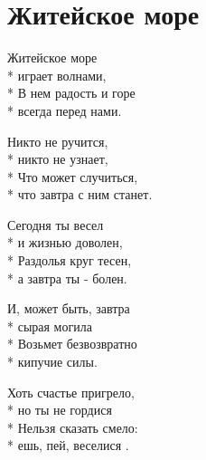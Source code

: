 \vspace{\fill}\newpage

\section{Житейское море}
\label{song:Житейское_море}

\medskip

\begin{minipage}{\linewidth}
Житейское море\\*
играет волнами,\\*
В нем радость и горе\\*
всегда перед нами.\\
\end{minipage}\par\medskip\nobreak

\medskip

\begin{minipage}{\linewidth}
Никто не ручится,\\*
никто не узнает,\\*
Что может случиться,\\*
что завтра с ним станет.\\
\end{minipage}\par\medskip\nobreak

\medskip

\begin{minipage}{\linewidth}
Сегодня ты весел\\*
и жизнью доволен,\\*
Раздолья круг тесен,\\*
а завтра ты - болен.\\
\end{minipage}\par\medskip\nobreak

\medskip

\begin{minipage}{\linewidth}
И, может быть, завтра\\*
сырая могила\\*
Возьмет безвозвратно\\*
кипучие силы.\\
\end{minipage}\par\medskip\nobreak

\medskip

\begin{minipage}{\linewidth}
Хоть счастье пригрело,\\*
но ты не гордися\\*
Нельзя сказать смело:\\*
ешь, пей, веселися .\\
\end{minipage}\par\medskip\nobreak

